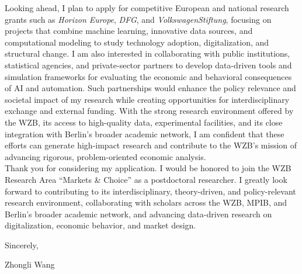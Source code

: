\documentclass{nfr}
\begin{document}
Looking ahead, I plan to apply for competitive European and national research grants such as \textit{Horizon Europe}, \textit{DFG}, and \textit{VolkswagenStiftung}, focusing on projects that combine machine learning, innovative data sources, and computational modeling to study technology adoption, digitalization, and structural change. 
I am also interested in collaborating with public institutions, statistical agencies, and private-sector partners to develop data-driven tools and simulation frameworks for evaluating the economic and behavioral consequences of AI and automation. 
Such partnerships would enhance the policy relevance and societal impact of my research while creating opportunities for interdisciplinary exchange and external funding. 
With the strong research environment offered by the WZB, its access to high-quality data, experimental facilities, and its close integration with Berlin’s broader academic network, I am confident that these efforts can generate high-impact research and contribute to the WZB’s mission of advancing rigorous, problem-oriented economic analysis.\\

Thank you for considering my application. 
I would be honored to join the WZB Research Area “Markets \& Choice” as a postdoctoral researcher. 
I greatly look forward to contributing to its interdisciplinary, theory-driven, and policy-relevant research environment, collaborating with scholars across the WZB, MPIB, and Berlin’s broader academic network, and advancing data-driven research on digitalization, economic behavior, and market design.
\vspace{3mm}

\noindent Sincerely,\\
\vspace{10mm}

\noindent Zhongli Wang

\vspace{5mm}


\end{document}
